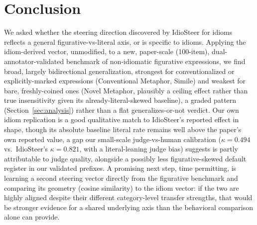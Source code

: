 \documentclass[11pt]{article}
\begin{document}
\section{Conclusion}
\label{sec:conclusion}

We asked whether the steering direction discovered by IdioSteer for idioms reflects a
general figurative-vs-literal axis, or is specific to idioms. Applying the idiom-derived
vector, unmodified, to a new, paper-scale (100-item), dual-annotator-validated benchmark
of non-idiomatic figurative expressions, we find broad, largely bidirectional
generalization, strongest for conventionalized or explicitly-marked expressions
(Conventional Metaphor, Simile) and weakest for bare, freshly-coined ones (Novel
Metaphor, plausibly a ceiling effect rather than true insensitivity given its
already-literal-skewed baseline), a graded pattern (Section~\ref{sec:analysis}) rather
than a flat generalizes-or-not verdict. Our own
idiom replication is a good qualitative match to IdioSteer's reported effect in shape,
though its absolute baseline literal rate remains well above the paper's own reported
value, a gap our small-scale judge-vs-human calibration ($\kappa=0.494$ vs.\ IdioSteer's
$\kappa=0.821$, with a literal-leaning judge bias) suggests is partly attributable to
judge quality, alongside a possibly less figurative-skewed default register in our
validated prefixes. A promising next step, time permitting, is learning a second
steering vector directly from the figurative benchmark and comparing its geometry
(cosine similarity) to the idiom vector: if the two are highly aligned despite their
different category-level transfer strengths, that would be stronger evidence for a
shared underlying axis than the behavioral comparison alone can provide.
\end{document}
